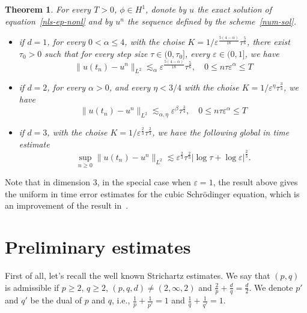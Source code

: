 \documentclass[10pt,a4paper]{article}
\newtheorem{theorem}{Theorem}[section]
\begin{document}
  \begin{theorem}
    For every \( T > 0 \), \( \phi \in H^1 \), donote by \(u\) the exact solution
    of equation~\eqref{nls-ep-nonl} and by \(u^n\) the sequence defined by the 
    scheme~\eqref{num-sol}.
    \begin{itemize}
      \item if \(d=1\), for every \(0 < \alpha \leq 4\), with the choise 
        \(K=1/\varepsilon^\frac{5(4-\alpha)}{18}\tau^\frac56\), there exist \(\tau_0 > 0\) 
        such that for every step size \(\tau \in (0,\tau_0]\), every 
        \( \varepsilon \in (0,1] \), we have 
        \[ \|u(t_n)-u^n\|_{L^2} \lesssim_\alpha \varepsilon^\frac{5(4-\alpha)}{18}\tau^\frac56, \quad 
        0 \leq n\tau\varepsilon^\alpha \leq T \]
      \item if \(d=2\), for every \(\alpha > 0\), and every \(\eta < 3/4\) with 
        the choise \(K=1/\varepsilon^\eta\tau^\frac34\), we have
        \[ \|u(t_n)-u^n\|_{L^2} \lesssim_{\alpha,\eta} \varepsilon^\beta \tau^\frac34, \quad 
        0 \leq n\tau\varepsilon^\alpha \leq T \]
      \item if \(d=3\), with the choise \(K=1/\varepsilon^\frac23\tau^\frac23\),
        we have the following global in time estimate
        \[ \sup_{n \geq 0} \|u(t_n)-u^n\|_{L^2} \lesssim \varepsilon^\frac23 
        \tau^\frac23|\log\tau+\log\varepsilon|^\frac23. \]
    \end{itemize}
  \end{theorem}

  Note that in dimension \(3\), in the special case when \(\varepsilon=1\), the
  result above gives the uniform in time error estimates for the cubic
  Schr\"odinger equation, which is an improvement of the result in~\cite{ORS21}.


  \section{Preliminary estimates}

  First of all, let's recall the well known Strichartz estimates. We say that 
  \( (p,q) \) is admissible if \(p \geq 2\), \(q \geq 2\), \((p,q,d) \neq (2,\infty,2)\)
  and \( \frac2p + \frac{d}q = \frac{d}2 \). We denote \(p'\)
  and \(q'\) be the dual of \(p\) and \(q\), i.e., \(\frac1p+\frac1{p'} = 1\) 
  and \(\frac1q+\frac1{q'} = 1\). 
\end{document}
